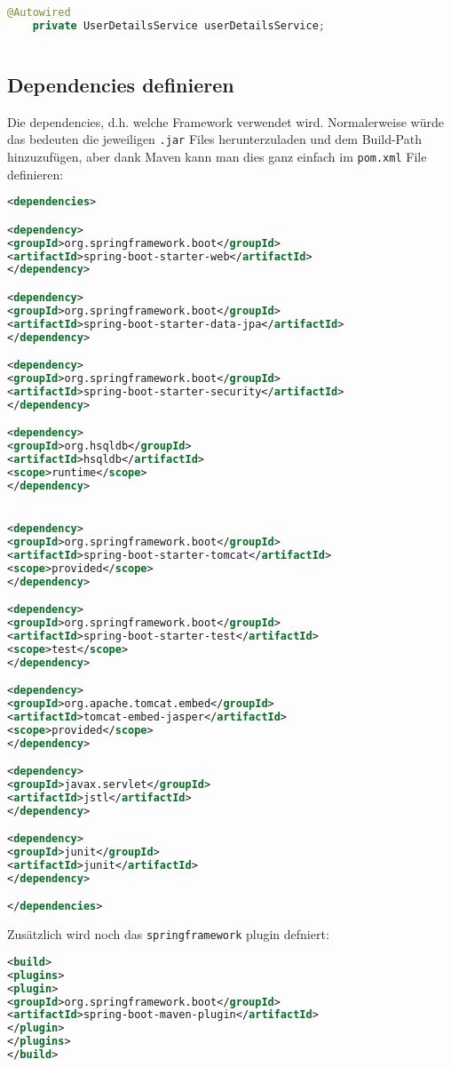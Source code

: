 \begin{lstlisting}[language=Java]
	@Autowired
	private UserDetailsService userDetailsService;
	
\end{lstlisting}

\subsection{Dependencies definieren}
Die dependencies, d.h. welche Framework verwendet wird. Normalerweise würde das bedeuten die jeweiligen \verb|.jar| Files herunterzuladen und dem Build-Path hinzuzufügen, aber dank Maven kann man dies ganz einfach im \verb|pom.xml| File definieren:

\begin{lstlisting}[language=xml]
<dependencies>

<dependency>
<groupId>org.springframework.boot</groupId>
<artifactId>spring-boot-starter-web</artifactId>
</dependency>

<dependency>
<groupId>org.springframework.boot</groupId>
<artifactId>spring-boot-starter-data-jpa</artifactId>
</dependency>

<dependency>
<groupId>org.springframework.boot</groupId>
<artifactId>spring-boot-starter-security</artifactId>
</dependency>

<dependency>
<groupId>org.hsqldb</groupId>
<artifactId>hsqldb</artifactId>
<scope>runtime</scope>
</dependency>


<dependency>
<groupId>org.springframework.boot</groupId>
<artifactId>spring-boot-starter-tomcat</artifactId>
<scope>provided</scope>
</dependency>

<dependency>
<groupId>org.springframework.boot</groupId>
<artifactId>spring-boot-starter-test</artifactId>
<scope>test</scope>
</dependency>

<dependency>
<groupId>org.apache.tomcat.embed</groupId>
<artifactId>tomcat-embed-jasper</artifactId>
<scope>provided</scope>
</dependency>

<dependency>
<groupId>javax.servlet</groupId>
<artifactId>jstl</artifactId>
</dependency>

<dependency>
<groupId>junit</groupId>
<artifactId>junit</artifactId>
</dependency>

</dependencies>
\end{lstlisting}

Zusätzlich wird noch das \verb|springframework| plugin defniert:

\begin{lstlisting}[language=xml]
<build>
<plugins>
<plugin>
<groupId>org.springframework.boot</groupId>
<artifactId>spring-boot-maven-plugin</artifactId>
</plugin>
</plugins>
</build>
\end{lstlisting}

